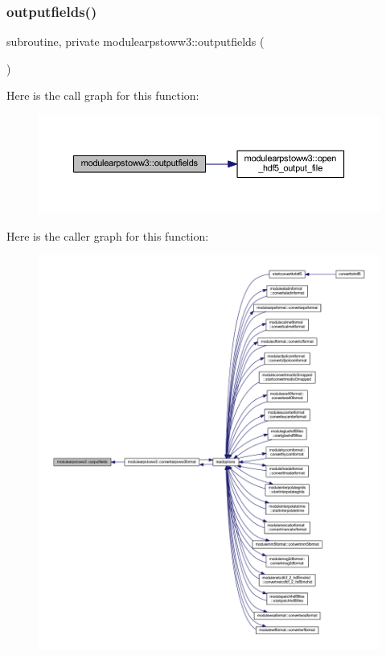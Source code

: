 \subsubsection{\texorpdfstring{outputfields()}{outputfields()}}
{\footnotesize\ttfamily subroutine, private modulearpstoww3\+::outputfields (\begin{DoxyParamCaption}{ }\end{DoxyParamCaption})\hspace{0.3cm}{\ttfamily [private]}}

Here is the call graph for this function\+:\nopagebreak
\begin{figure}[H]
\begin{center}
\leavevmode
\includegraphics[width=350pt]{namespacemodulearpstoww3_a7c18511d187912f655458191bcf1c7af_cgraph}
\end{center}
\end{figure}
Here is the caller graph for this function\+:\nopagebreak
\begin{figure}[H]
\begin{center}
\leavevmode
\includegraphics[width=350pt]{namespacemodulearpstoww3_a7c18511d187912f655458191bcf1c7af_icgraph}
\end{center}
\end{figure}
\mbox{\label{namespacemodulearpstoww3_a7642538ceff4533a4ad2aeba84fb2d32}} 
